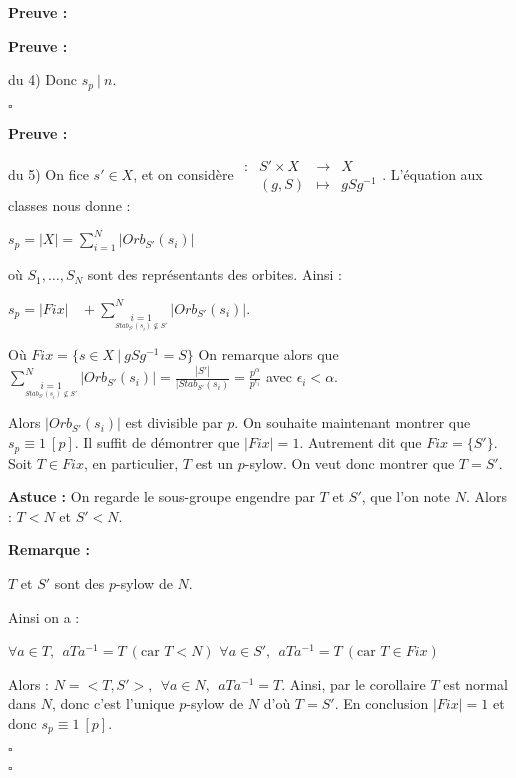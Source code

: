 \documentclass{report}
\renewenvironment{leftbar}{%
  \def\FrameCommand{\vrule width 0.4pt \hspace{10pt}}%
  \MakeFramed {\advance\hsize-\width \FrameRestore}}%
 {\endMakeFramed}%
\newenvironment{preuve}{\vspace*{0.5cm}
    \begin{leftbar}
    \noindent\textbf{Preuve :}\par}{
    \begin{flushright}
    $\square$
    \end{flushright}
    \end{leftbar}
}
\newcommand{\remarque}{
    \noindent\textbf{Remarque :} \par
}
\newcommand{\fonction}[5]{
    \begin{array}{l|rcl}
    #1: & #2 & \longrightarrow & #3 \\
        & #4 & \longmapsto & #5 
    \end{array}
}
\begin{document}
\begin{preuve}
\begin{preuve}{du 4)}
            Donc $s_p ~|~n$.
        \end{preuve}
        
        
        \begin{preuve}{du 5)}
            On fice $s'\in X$, et on considère $\fonction{}{S' \times X}{X}{(g,S)}{gSg^{-1}}$. L'équation aux classes nous donne : 
        
            \begin{center}
                $s_p= |X| = \displaystyle \sum ^N _{i=1}|Orb_{S'}(s_i)|$
        
            \end{center}
        
            où $S_1, \dots, S_N$ sont des représentants des orbites. Ainsi :
        
            \begin{center}
                $s_p=|Fix|~~~~+\displaystyle \sum ^N _{\underset{Stab_{S'}(s_i)\nsubseteq S'}{i=1}}|Orb_{S'}(s_i)|$.
            \end{center}
        
            Où $Fix = \{ s \in X ~|~gSg^{-1} =S\}$ On remarque alors que $\displaystyle \sum ^N _{\underset{Stab_{S'}(s_i)\nsubseteq S'}{i=1}}|Orb_{S'}(s_i)| = \frac{|S'|}{|Stab_{S'}(s_i)}=\frac{p^\alpha}{p^{\epsilon _i}}$ avec $\epsilon_i < \alpha$. 
            
            \newline 
        
            Alors $|Orb_{S'}(s_i)|$ est divisible par $p$. On souhaite maintenant montrer que $s_p \equiv 1 ~[p]$. Il suffit de démontrer que $|Fix | =1$. Autrement dit que $Fix = \{S'\}$. Soit $T\in Fix$, en particulier, $T$ est un $p$-sylow. On veut donc montrer que $T = S'$.
        
            \bigbreak
        
            \textbf{Astuce :} On regarde le sous-groupe engendre par $T$ et $S'$, que l'on note $N$. Alors : $T <N$ et $S'<N$.
        
            \remarque $T$ et $S'$ sont des $p$-sylow de $N$. 
    
            \bigbreak Ainsi on a : 
        
            \begin{center}
                $\forall a \in T, ~~aTa^{-1}=T~(\text{car }T<N)$ \newline 
                $\forall a \in S', ~~aTa^{-1}=T~(\text{car }T\in Fix)$
            \end{center}
            
            Alors : $N = <T,S'>, ~~\forall a \in N,~~aTa^{-1}=T$. Ainsi, par le corollaire $T$ est normal dans $N$, donc c'est l'unique $p$-sylow de $N$ d'où $T =S'$. En conclusion $|Fix| = 1$ et  donc $s_p \equiv 1 ~[p]$. 
            
        \end{preuve}
    \end{preuve}
\end{document}
